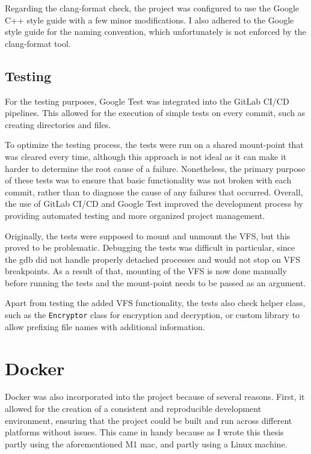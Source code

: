 Regarding the clang-format check, the project was configured to use the Google C++ style guide\cite{google_cpp_style_guide} with a few minor modifications.
I also adhered to the Google style guide for the naming convention, which unfortunately is not enforced by the clang-format tool.

\subsection{Testing}\label{subsec:testing}

For the testing purposes, Google Test was integrated into the GitLab CI/CD pipelines.
This allowed for the execution of simple tests on every commit, such as creating directories and files.

To optimize the testing process, the tests were run on a shared mount-point that was cleared every time, although this approach is not ideal as it can make it harder to determine the root cause of a failure.
Nonetheless, the primary purpose of these tests was to ensure that basic functionality was not broken with each commit, rather than to diagnose the cause of any failures that occurred.
Overall, the use of GitLab CI/CD and Google Test improved the development process by providing automated testing and more organized project management.

Originally, the tests were supposed to mount and unmount the VFS, but this proved to be problematic.
Debugging the tests was difficult in particular, since the gdb did not handle properly detached processes and would not stop on VFS breakpoints.
As a result of that, mounting of the VFS is now done manually before running the tests and the mount-point needs to be passed as an argument.

Apart from testing the added VFS functionality, the tests also check helper class, such as the \texttt{Encryptor} class for encryption and decryption, or custom library to allow prefixing file names with additional information.

\section{Docker}\label{sec:docker}

Docker\cite{docker} was also incorporated into the project because of several reasons.
First, it allowed for the creation of a consistent and reproducible development environment, ensuring that the project could be built and run across different platforms without issues.
This came in handy because as I wrote this thesis partly using the aforementioned M1 mac, and partly using a Linux machine.

